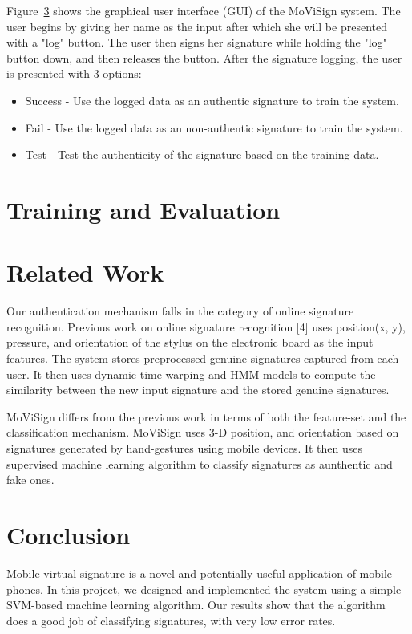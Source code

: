 \documentclass[12pt]{article}
\begin{document}
Figure~\ref{} shows the graphical user interface (GUI) of the MoViSign system. The user begins by giving her name as the input after which she will be presented with a "log" button. The user then signs her signature while holding the "log" button down, and then releases the button. After the signature logging, the user is presented with 3 options:
\begin{itemize}
\item Success - Use the logged data as an authentic signature to train the system.
\item Fail - Use the logged data as an non-authentic signature to train the system.
\item Test - Test the authenticity of the signature based on the training data.
\end{itemize}

\section{Training and Evaluation}

\section{Related Work}

Our authentication mechanism falls in the category of online signature recognition. Previous work on online signature recognition [4] uses position(x, y), pressure, and orientation of the stylus on the electronic board as the input features. The system stores preprocessed genuine signatures captured from each user. It then uses dynamic time warping and HMM models to compute the similarity between the new input signature and the stored genuine signatures.

MoViSign differs from the previous work in terms of both the feature-set and the classification mechanism. MoViSign uses 3-D position, and orientation based on signatures generated by hand-gestures using mobile devices. It then uses supervised machine learning algorithm to classify signatures as aunthentic and fake ones.
 
\section{Conclusion}

Mobile virtual signature is a novel and potentially useful application of mobile phones. In this project, we designed and implemented the system using a simple SVM-based machine learning algorithm. Our results show that the algorithm does a good job of classifying signatures, with very low error rates.
\end{document}
